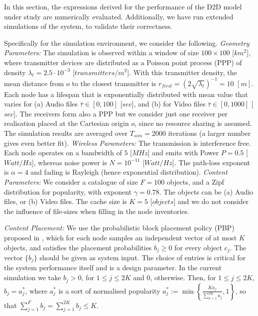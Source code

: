 \documentclass[conference]{IEEEtran}
\begin{document}
In this section, the expressions derived for the performance of the D2D model under study are numerically evaluated. Additionally, we have run extended simulations of the system, to validate their correctness. 

Specifically for the simulation environment, we consider the following. \textit{Geometry Parameters:} The simulation is observed within a window of size $100\times 100$ [$km^2$], where transmitter devices are distributed as a Poisson point process (PPP) of density $\lambda_t = 2.5 \cdot 10^{-3}$ [$transmitters/m^2$]. With this transmitter density, the mean distance from $o$ to the closest transmitter is $r_{first} = (2\sqrt{\lambda_t})^{-1} = 10$ $[m]$. Each node has a lifespan that is exponentially distributed with mean value that varies for (a) Audio files $\bar{\tau} \in \left[0, 100\right]$ [$sec$], and (b) for Video files $\bar{\tau}\in\left[0, 1000\right]$ [$sec$]. The receivers form also a PPP but we consider just one receiver per realisation placed at the Cartesian origin $o$, since no resource sharing is assumed. The simulation results are averaged over $T_{sim} = 2000$ iterations (a larger number gives even better fit). \textit{Wireless Parameters:} The transmission is interference free. Each node operates on a bandwidth of $5$ [$MHz$] and emits with Power $P=0.5$ [$Watt/Hz$], whereas noise power is $N=10^{-11}$ [$Watt/Hz$]. The path-loss exponent is $\alpha=4$ and fading is Rayleigh (hence exponential distribution). \textit{Content Parameters:} We consider a catalogue of size $F=100$ objects, and a Zipf distribution for popularity, with exponent $\gamma=0.78$. The objects can be (a) Audio files, or (b) Video files. The cache size is $K=5$ [$objects$] and we do not consider the influence of file-sizes when filling in the node inventories.

\textit{Content Placement:} We use the probabilistic block placement policy (PBP) proposed in \cite{BlaGioICC15}, which for each node samples an independent vector of at most $K$ objects, and satisfies the placement probabilities $b_j\geq 0$ for every object $c_j$. The vector $\{b_j\}$ should be given as system input. The choice of entries is critical for the system performance itself and is a design parameter. In the current simulation we take $b_j >0$, for $1\leq j \leq 2K$ and $0$, otherwise. Then, for $1\leq j \leq 2K$, $b_j = a_j^*$, where $a_j^*$ is a sort of normalised popularity $a_j^* := \min\left\{\frac{Ka_j}{\sum_{k=1}^{2K} a_j}, 1\right\}$, so that $\sum_{j=1}^F b_j = \sum_{j=1}^{2K} b_j \leq K$.
\end{document}
